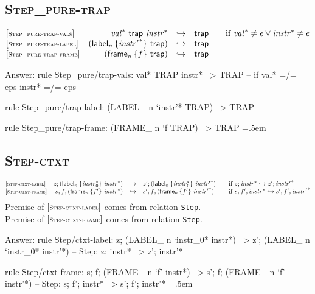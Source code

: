 \documentclass{article}
\newenvironment{lcverbatim}
 {\SaveVerbatim{cverb}}
 {\endSaveVerbatim
  \flushleft\fboxrule=0pt\fboxsep=.5em
  \colorbox{cverbbg}{%
    \makebox[\dimexpr\linewidth-2\fboxsep][l]{\BUseVerbatim{cverb}}%
  }
  \endflushleft
}
\newcommand\K[1]{\texttt{#1}}
\begin{document}
\subsection{\normalfont\normalsize\textsc {Step\_pure{-}trap}}
$$
\begin{array}{@{}l@{}rcl@{}l@{}}
{[\textsc{\scriptsize Step\_pure{-}trap{-}vals}]} \quad & {{\mathit{val}}^\ast}~\mathsf{trap}~{{\mathit{instr}}^\ast} &\hookrightarrow& \mathsf{trap}
  &\qquad \mbox{if}~{{\mathit{val}}^\ast} \neq \epsilon \lor {{\mathit{instr}}^\ast} \neq \epsilon \\
{[\textsc{\scriptsize Step\_pure{-}trap{-}label}]} \quad & ({\mathsf{label}}_{n}\,\{ {{\mathit{instr}'}^\ast} \}~\mathsf{trap}) &\hookrightarrow& \mathsf{trap} \\
{[\textsc{\scriptsize Step\_pure{-}trap{-}frame}]} \quad & ({\mathsf{frame}}_{n}\,\{ f \}~\mathsf{trap}) &\hookrightarrow& \mathsf{trap} \\
\end{array}
$$
{\color{red}
	Answer:
	\begin{lcverbatim}
rule Step_pure/trap-vals:
  val* TRAP instr*  ~>  TRAP
  -- if val* =/= eps \/ instr* =/= eps

rule Step_pure/trap-label:
  (LABEL_ n `{instr'*} TRAP)  ~>  TRAP

rule Step_pure/trap-frame:
  (FRAME_ n `{f} TRAP)  ~>  TRAP
	\end{lcverbatim}
}

\subsection{\normalfont\normalsize\textsc {Step{-}ctxt}}
$$
\begin{array}{@{}l@{}rcl@{}l@{}}
{[\textsc{\scriptsize Step{-}ctxt{-}label}]} \quad & z ; ({\mathsf{label}}_{n}\,\{ {{\mathit{instr}}_0^\ast} \}~{{\mathit{instr}}^\ast}) &\hookrightarrow& {z'} ; ({\mathsf{label}}_{n}\,\{ {{\mathit{instr}}_0^\ast} \}~{{\mathit{instr}'}^\ast})
  &\qquad \mbox{if}~z ; {{\mathit{instr}}^\ast} \hookrightarrow {z'} ; {{\mathit{instr}'}^\ast} \\
{[\textsc{\scriptsize Step{-}ctxt{-}frame}]} \quad & s ; f ; ({\mathsf{frame}}_{n}\,\{ {f'} \}~{{\mathit{instr}}^\ast}) &\hookrightarrow& {s'} ; f ; ({\mathsf{frame}}_{n}\,\{ {f'} \}~{{\mathit{instr}'}^\ast})
  &\qquad \mbox{if}~s ; {f'} ; {{\mathit{instr}}^\ast} \hookrightarrow {s'} ; {f'} ; {{\mathit{instr}'}^\ast} \\
\end{array}
$$
Premise of $[\textsc{\scriptsize Step{-}ctxt{-}label}]$ comes from relation \K{Step}. \\
Premise of $[\textsc{\scriptsize Step{-}ctxt{-}frame}]$ comes from relation \K{Step}. \\
{\color{red}
	Answer:
	\begin{lcverbatim}
rule Step/ctxt-label:
  z; (LABEL_ n `{instr_0*} instr*)  ~>  z'; (LABEL_ n `{instr_0*} instr'*)
  -- Step: z; instr* ~> z'; instr'*

rule Step/ctxt-frame:
  s; f; (FRAME_ n `{f'} instr*)  ~>  s'; f; (FRAME_ n `{f'} instr'*)
  -- Step: s; f'; instr* ~> s'; f'; instr'*
	\end{lcverbatim}
}
\end{document}
